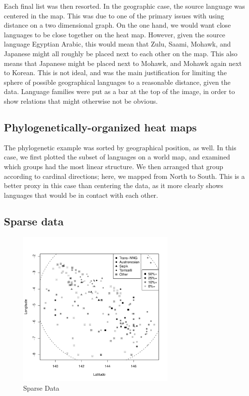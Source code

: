\documentclass[11pt]{article}
\begin{document}

Each final list was then resorted. In the geographic case, the source language was centered in the map. This was due to one of the primary issues with using distance on a two dimensional graph. On the one hand, we would want close languages to be close together on the heat map. However, given the source language Egyptian Arabic, this would mean that Zulu, Saami, Mohawk, and Japanese might all roughly be placed next to each other on the map. This also means that Japanese might be placed next to Mohawk, and Mohawk again next to Korean. This is not ideal, and was the main justification for limiting the sphere of possible geographical languages to a reasonable distance, given the data. Language families were put as a bar at the top of the image, in order to show relations that might otherwise not be obvious.


\subsection{Phylogenetically-organized heat maps}

The phylogenetic example was sorted by geographical position, as well. In this case, we first plotted the subset of languages on a world map, and examined which groups had the most linear structure. We then arranged that group according to cardinal directions; here, we mapped from North to South. This is a better proxy in this case than centering the data, as it more clearly shows languages that would be in contact with each other. 


\subsection{Sparse data}


\begin{figure}[h]
\includegraphics[width=3.1in]
{graph1sparse.pdf} 
\caption{Sparse Data} 
\label{fig:sparse} 
\end{figure}
\end{document}
